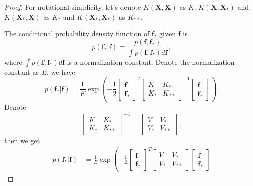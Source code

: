 \documentclass[11pt,a4paper]{article}
\theoremstyle{definition}
\numberwithin{equation}{section}
\let\vec\mathbf
\begin{document}
	\begin{proof}
		For notational simplicity, let's denote $K(\vec X,\vec X)$ as $K$, $K(\vec X,\vec X_*)$ and $K(\vec X_*,\vec X)$ as $K_*$ and $K(\vec X_*,\vec X_*)$ as $K_{**}$.
		
		The conditional probability density function of $\vec f_*$ given $\vec f$ is 
		\begin{equation}\label{conditional_pdf}
		p(\vec f_*|\vec f) = \frac{p(\vec f, \vec f_*)}{\int p(\vec f,\vec f_*)d\vec f},
		\end{equation}
		where $\int p(\vec f,\vec f_*)d\vec f$ is a normalization constant. Denote the normalization constant as $E$, we have
		\begin{equation}
		p(\vec f_*|\vec f) = \frac{1}{E}\exp \left(-\frac{1}{2}
		\begin{bmatrix}
		\vec f\\
		\vec f_*
		\end{bmatrix}^T
		\begin{bmatrix}
		K & K_*\\
		K_* & K_{**}
		\end{bmatrix}^{-1}
		\begin{bmatrix}
		\vec f\\
		\vec f_*
		\end{bmatrix}
		\right).
		\end{equation}
		Denote 
		\begin{equation}
		\begin{bmatrix}
		K & K_*\\
		K_* & K_{**}
		\end{bmatrix}^{-1}
		=
		\begin{bmatrix}
		V & V_*\\
		V_* & V_{**}
		\end{bmatrix},
		\end{equation}
		then we get
		\begin{equation}
		\begin{split}
		p(\vec f_*|\vec f) &= \frac{1}{E}\exp \left(-\frac{1}{2}
		\begin{bmatrix}
		\vec f\\
		\vec f_*
		\end{bmatrix}^T
		\begin{bmatrix}
		V & V_*\\
		V_* & V_{**}
		\end{bmatrix}
		\begin{bmatrix}
		\vec f\\
		\vec f_*
		\end{bmatrix}

\end{split}
\end{equation}
\end{proof}
\end{document}
